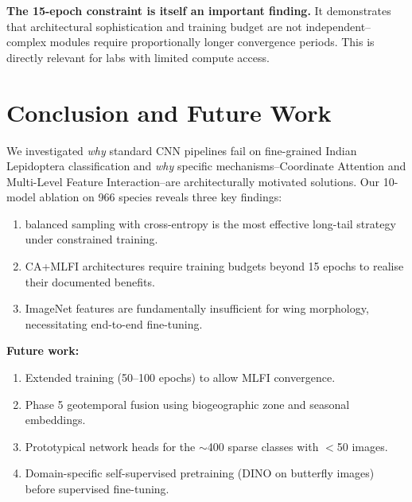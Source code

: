 \documentclass[10pt, twocolumn]{article}
\begin{document}
\textbf{The 15-epoch constraint is itself an important finding.} It demonstrates that architectural sophistication and training budget are not independent--complex modules require proportionally longer convergence periods. This is directly relevant for labs with limited compute access.

\section{Conclusion and Future Work}
\label{sec:conclusion}

We investigated \emph{why} standard CNN pipelines fail on fine-grained Indian Lepidoptera classification and \emph{why} specific mechanisms--Coordinate Attention and Multi-Level Feature Interaction--are architecturally motivated solutions. Our 10-model ablation on 966 species reveals three key findings:
\begin{enumerate}[label=(\arabic*)]
    \item balanced sampling with cross-entropy is the most effective long-tail strategy under constrained training.
    \item CA+MLFI architectures require training budgets beyond 15 epochs to realise their documented benefits.
    \item ImageNet features are fundamentally insufficient for wing morphology, necessitating end-to-end fine-tuning.
\end{enumerate}
\textbf{Future work:}
\begin{enumerate}[label=(\alph*)]
    \item Extended training (50--100 epochs) to allow MLFI convergence.
    \item Phase 5 geotemporal fusion using biogeographic zone and seasonal embeddings.
    \item Prototypical network heads for the $\sim$400 sparse classes with $<$50 images.
    \item Domain-specific self-supervised pretraining (DINO on butterfly images) before supervised fine-tuning.
\end{enumerate}

\clearpage
\onecolumn


\end{document}
